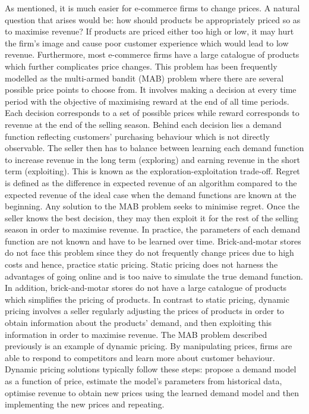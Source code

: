 \documentclass[a4paper]{article}
\begin{document}
As mentioned, it is much easier for e-commerce firms to change prices. A natural question that arises would be: how should products be appropriately priced so as to maximise revenue? If products are priced either too high or low, it may hurt the firm's image and cause poor customer experience which would lead to low revenue. Furthermore, most e-commerce firms have a large catalogue of products which further complicates price changes. This problem has been frequently modelled as the multi-armed bandit (MAB) problem where there are several possible price points to choose from. It involves making a decision at every time period with the objective of maximising reward at the end of all time periods. Each decision corresponds to a set of possible prices while reward corresponds to revenue at the end of the selling season. Behind each decision lies a demand function reflecting customers' purchasing behaviour which is not directly observable. The seller then has to balance between learning each demand function to increase revenue in the long term (exploring) and earning revenue in the short term (exploiting). This is known as the exploration-exploitation trade-off. Regret is defined as the difference in expected revenue of an algorithm compared to the expected revenue of the ideal case when the demand functions are known at the beginning. Any solution to the MAB problem seeks to minimise regret. Once the seller knows the best decision, they may then exploit it for the rest of the selling season in order to maximise revenue. In practice, the parameters of each demand function are not known and have to be learned over time. Brick-and-motar stores do not face this problem since they do not frequently change prices due to high costs \cite{anderson} and hence, practice static pricing. Static pricing does not harness the advantages of going online and is too naive to simulate the true demand function.  In addition, brick-and-motar stores do not have a large catalogue of products which simplifies the pricing of products.
\newline
\newline
In contrast to static pricing, dynamic pricing involves a seller regularly adjusting the prices of products in order to obtain information about the products' demand, and then exploiting this information in order to maximise revenue. The MAB problem described previously is an example of dynamic pricing. By manipulating prices, firms are able to respond to competitors and learn more about customer behaviour. Dynamic pricing solutions typically follow these steps: propose a demand model as a function of price, estimate the model's parameters from historical data, optimise revenue to obtain new prices using the learned demand model and then implementing the new prices and repeating.
\end{document}
